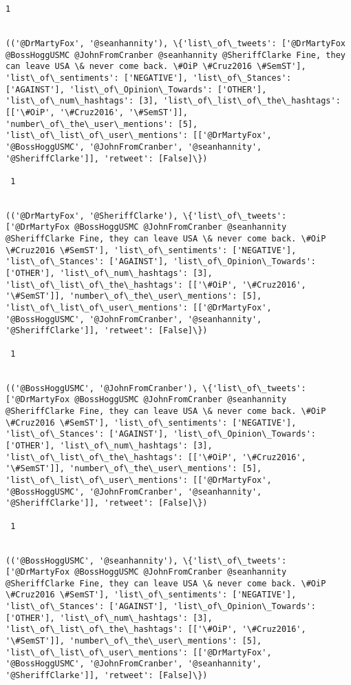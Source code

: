 \documentclass[11pt]{article}
\begin{document}
\begin{Verbatim}[commandchars=\\\{\}]
 1
 

(('@DrMartyFox', '@seanhannity'), \{'list\_of\_tweets': ['@DrMartyFox @BossHoggUSMC @JohnFromCranber @seanhannity @SheriffClarke Fine, they can leave USA \& never come back. \#OiP \#Cruz2016 \#SemST'], 'list\_of\_sentiments': ['NEGATIVE'], 'list\_of\_Stances': ['AGAINST'], 'list\_of\_Opinion\_Towards': ['OTHER'], 'list\_of\_num\_hashtags': [3], 'list\_of\_list\_of\_the\_hashtags': [['\#OiP', '\#Cruz2016', '\#SemST']], 'number\_of\_the\_user\_mentions': [5], 'list\_of\_list\_of\_user\_mentions': [['@DrMartyFox', '@BossHoggUSMC', '@JohnFromCranber', '@seanhannity', '@SheriffClarke']], 'retweet': [False]\})

 1
 

(('@DrMartyFox', '@SheriffClarke'), \{'list\_of\_tweets': ['@DrMartyFox @BossHoggUSMC @JohnFromCranber @seanhannity @SheriffClarke Fine, they can leave USA \& never come back. \#OiP \#Cruz2016 \#SemST'], 'list\_of\_sentiments': ['NEGATIVE'], 'list\_of\_Stances': ['AGAINST'], 'list\_of\_Opinion\_Towards': ['OTHER'], 'list\_of\_num\_hashtags': [3], 'list\_of\_list\_of\_the\_hashtags': [['\#OiP', '\#Cruz2016', '\#SemST']], 'number\_of\_the\_user\_mentions': [5], 'list\_of\_list\_of\_user\_mentions': [['@DrMartyFox', '@BossHoggUSMC', '@JohnFromCranber', '@seanhannity', '@SheriffClarke']], 'retweet': [False]\})

 1
 

(('@BossHoggUSMC', '@JohnFromCranber'), \{'list\_of\_tweets': ['@DrMartyFox @BossHoggUSMC @JohnFromCranber @seanhannity @SheriffClarke Fine, they can leave USA \& never come back. \#OiP \#Cruz2016 \#SemST'], 'list\_of\_sentiments': ['NEGATIVE'], 'list\_of\_Stances': ['AGAINST'], 'list\_of\_Opinion\_Towards': ['OTHER'], 'list\_of\_num\_hashtags': [3], 'list\_of\_list\_of\_the\_hashtags': [['\#OiP', '\#Cruz2016', '\#SemST']], 'number\_of\_the\_user\_mentions': [5], 'list\_of\_list\_of\_user\_mentions': [['@DrMartyFox', '@BossHoggUSMC', '@JohnFromCranber', '@seanhannity', '@SheriffClarke']], 'retweet': [False]\})

 1
 

(('@BossHoggUSMC', '@seanhannity'), \{'list\_of\_tweets': ['@DrMartyFox @BossHoggUSMC @JohnFromCranber @seanhannity @SheriffClarke Fine, they can leave USA \& never come back. \#OiP \#Cruz2016 \#SemST'], 'list\_of\_sentiments': ['NEGATIVE'], 'list\_of\_Stances': ['AGAINST'], 'list\_of\_Opinion\_Towards': ['OTHER'], 'list\_of\_num\_hashtags': [3], 'list\_of\_list\_of\_the\_hashtags': [['\#OiP', '\#Cruz2016', '\#SemST']], 'number\_of\_the\_user\_mentions': [5], 'list\_of\_list\_of\_user\_mentions': [['@DrMartyFox', '@BossHoggUSMC', '@JohnFromCranber', '@seanhannity', '@SheriffClarke']], 'retweet': [False]\})


\end{Verbatim}
\end{document}

